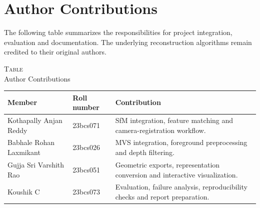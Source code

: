 \documentclass[conference]{IEEEtran}
\begin{document}
\section*{Author Contributions}
\noindent The following table summarizes the responsibilities for project integration, evaluation and documentation. The underlying reconstruction algorithms remain credited to their original authors.
\begin{center}
\small
{}\label{tab:contributions}\textsc{Table \thetable}\\[2pt]
Author Contributions\\[5pt]
\setlength{\tabcolsep}{3pt}
\renewcommand{\arraystretch}{1.2}
\begin{tabular}{@{}>{\raggedright\arraybackslash}p{}>{\raggedright\arraybackslash}p{}>{\raggedright\arraybackslash}p{}@{}}
\toprule
\textbf{Member} & \textbf{Roll number} & \textbf{Contribution}\\\midrule
Kothapally Anjan Reddy & 23bcs071 & SfM integration, feature matching and camera-registration workflow.\\\midrule
Babhale Rohan Laxmikant & 23bcs026 & MVS integration, foreground preprocessing and depth filtering.\\\midrule
Gujja Sri Varshith Rao & 23bcs051 & Geometric exports, representation conversion and interactive visualization.\\\midrule
Koushik C & 23bcs073 & Evaluation, failure analysis, reproducibility checks and report preparation.\\\bottomrule
\end{tabular}
\end{center}
\end{document}
